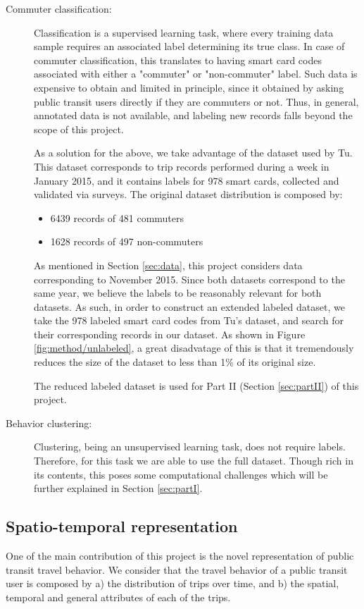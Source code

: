 \documentclass{article}
\begin{document}
\begin{description}%
\item[Commuter classification:]
Classification is a supervised learning task, where every training data sample requires an associated label determining its true class. In case of commuter classification, this translates to having smart card codes associated with either a "commuter" or "non-commuter" label. Such data is expensive to obtain and limited in principle, since it obtained by asking public transit users directly if they are commuters or not. Thus, in general, annotated data is not available, and labeling new records falls beyond the scope of this project. 

As a solution for the above, we take advantage of the dataset used by Tu\cite{tu2016impact}. This dataset corresponds to trip records performed during a week in January 2015, and it contains labels for 978 smart cards, collected and validated via surveys. The original dataset distribution is composed by:

\begin{itemize}
\item 6439 records of 481 commuters
\item 1628 records of 497 non-commuters
\end{itemize}

As mentioned in Section \ref{sec:data}, this project considers data corresponding to November 2015. Since both datasets correspond to the same year, we believe the labels to be reasonably relevant for both datasets. As such, in order to construct an extended labeled dataset, we take the 978 labeled smart card codes from Tu's dataset, and search for their corresponding records in our dataset. As shown in Figure \ref{fig:method/unlabeled}, a great disadvatage of this is that it tremendously reduces the size of the dataset to less than 1\% of its original size. 

The reduced labeled dataset is used for Part II (Section \ref{sec:partII}) of this project. 

\item[Behavior clustering:] %
Clustering, being an unsupervised learning task, does not require labels. Therefore, for this task we are able to use the full dataset. Though rich in its contents, this poses some computational challenges which will be further explained in Section \ref{sec:partI}. 
\end{description}

\subsection{Spatio-temporal representation}
\label{sec:structure}
One of the main contribution of this project is the novel representation of public transit travel behavior. We consider that the travel behavior of a public transit user is composed by a) the distribution of trips over time, and b) the spatial, temporal and general attributes of each of the trips. 
\end{document}

